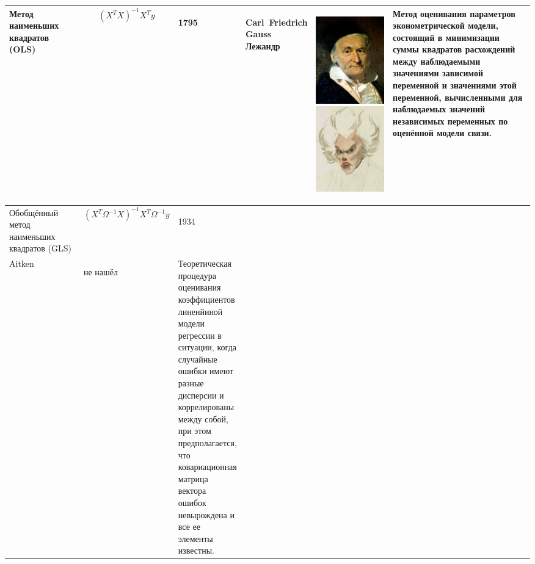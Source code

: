 \documentclass[10pt,a4paper]{article}
\begin{document}
\begin{table}[H]
{\begin{tabular}{|m{0.15\linewidth}|m{0.17\linewidth}|m{0.1\linewidth}|m{0.1\linewidth}|m{0.18\linewidth}|m{0.3\linewidth}|}
Метод наименьших \newline квадратов (OLS) &\[(X^{T}X)^{-1}X^Ty\] & \begin{center}1795 \end{center}& \begin{center}Carl~Friedrich Gauss \newline Лежандр \end{center}  & \begin{center}
\includegraphics[width= 0.31 \linewidth]{gauss.jpg}
\includegraphics[width= 0.32 \linewidth]{lezhandr.jpg} \end{center} & Метод оценивания параметров эконометрической модели, состоящий в минимизации суммы квадратов расхождений между наблюдаемыми значениями зависимой переменной и значениями этой переменной, вычисленными для наблюдаемых значений независимых переменных по оценённой модели связи.\\
\hline
Обобщённый метод  \newline наименьших квадратов  \newline (GLS) &  \[ (X^T \Omega^{-1} X)^{-1}X^T \Omega^{-1} y\] & \begin{center} 1934 \end{center} & \begin{center}Alexander \\ Aitken \end{center} & \begin{center} не нашёл \end{center} &  Теоретическая процедура оценивания коэффициентов линенйиной модели регрессии в ситуации, когда случайные ошибки имеют разные дисперсии и коррелированы между собой, при этом предполагается, что ковариационная матрица вектора ошибок невырождена и все ее элементы известны. \\
\hline


\end{tabular}}
\end{table}
\end{document}
